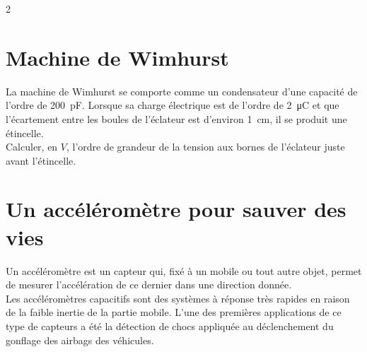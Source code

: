 \documentclass[a4paper,11pt,fleqn]{scrartcl}%
\begin{document}
\begin{multicols}{2}
\section{Machine de Wimhurst}
La machine de Wimhurst se comporte comme un condensateur d'une capacité de l'ordre de \SI{200}{\pico\farad}. Lorsque sa charge électrique est de l'ordre de \SI{2}{\micro\coulomb} et que l'écartement entre les boules de l'éclateur est d'environ \SI{1}{\centi\meter}, il se produit une étincelle.\\
Calculer, en $V$, l'ordre de grandeur de la tension aux bornes de l'éclateur juste avant l'étincelle.
\end{multicols}

\section{Un accéléromètre pour sauver des vies}
Un accéléromètre est un capteur qui, fixé à un mobile ou tout autre objet, permet de mesurer l'accélération de ce dernier dans une direction donnée.\\
Les accéléromètres capacitifs sont des systèmes à réponse très rapides en raison de la faible inertie de la partie mobile. L'une des premières applications de ce type de capteurs a été la détection de chocs appliquée au déclenchement du gonflage des airbags des véhicules.
\end{document}
